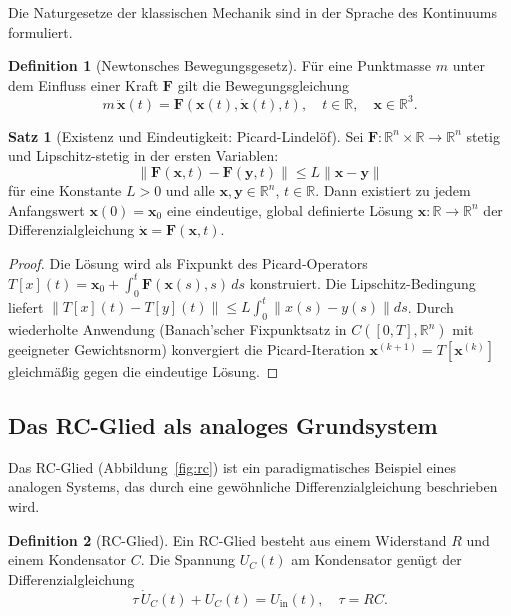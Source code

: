 ﻿\documentclass[a4paper,12pt]{article}
\theoremstyle{definition}
\newtheorem{definition}{Definition}
\newtheorem{satz}{Satz}
\begin{document}
Die Naturgesetze der klassischen Mechanik sind in der Sprache des Kontinuums formuliert.

\begin{definition}[Newtonsches Bewegungsgesetz]
Für eine Punktmasse $m$ unter dem Einfluss einer Kraft $\mathbf{F}$ gilt die
Bewegungsgleichung
\[
m\, \ddot{\mathbf{x}}(t) = \mathbf{F}(\mathbf{x}(t), \dot{\mathbf{x}}(t), t),
\quad t \in \mathbb{R}, \quad \mathbf{x} \in \mathbb{R}^3.
\]
\end{definition}

\begin{satz}[Existenz und Eindeutigkeit: Picard-Lindelöf]
\label{satz:picard}
Sei $\mathbf{F}: \mathbb{R}^n \times \mathbb{R} \to \mathbb{R}^n$ stetig und
Lipschitz-stetig in der ersten Variablen:
\[
\|\mathbf{F}(\mathbf{x},t) - \mathbf{F}(\mathbf{y},t)\| \leq L \|\mathbf{x}-\mathbf{y}\|
\]
für eine Konstante $L > 0$ und alle $\mathbf{x}, \mathbf{y} \in \mathbb{R}^n$, $t \in \mathbb{R}$.
Dann existiert zu jedem Anfangswert $\mathbf{x}(0) = \mathbf{x}_0$ eine eindeutige,
global definierte Lösung $\mathbf{x}: \mathbb{R} \to \mathbb{R}^n$ der
Differenzialgleichung $\dot{\mathbf{x}} = \mathbf{F}(\mathbf{x},t)$.
\end{satz}

\begin{proof}
Die Lösung wird als Fixpunkt des Picard-Operators
$T[x](t) = \mathbf{x}_0 + \int_0^t \mathbf{F}(\mathbf{x}(s), s) \, ds$
konstruiert.  Die Lipschitz-Bedingung liefert
$\|T[x](t) - T[y](t)\| \leq L\int_0^t \|x(s)-y(s)\| ds$.
Durch wiederholte Anwendung (Banach'scher Fixpunktsatz in $C([0,T],\mathbb{R}^n)$
mit geeigneter Gewichtsnorm) konvergiert die Picard-Iteration
$\mathbf{x}^{(k+1)} = T[\mathbf{x}^{(k)}]$ gleichmäßig gegen die eindeutige Lösung.
\end{proof}

\subsection{Das RC-Glied als analoges Grundsystem}

Das RC-Glied (Abbildung~\ref{fig:rc}) ist ein paradigmatisches Beispiel eines
analogen Systems, das durch eine gewöhnliche Differenzialgleichung beschrieben wird.

\begin{definition}[RC-Glied]
Ein RC-Glied besteht aus einem Widerstand $R$ und einem Kondensator $C$.
Die Spannung $U_C(t)$ am Kondensator genügt der Differenzialgleichung
\[
\tau \, \dot{U}_C(t) + U_C(t) = U_{\mathrm{in}}(t), \quad \tau = RC.
\]
\end{definition}
\end{document}
